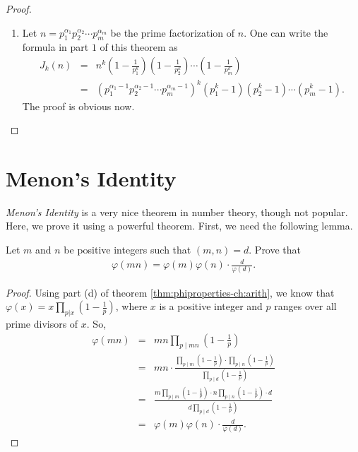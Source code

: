 \documentclass[12pt]{subfile}
\begin{document}
\begin{proof}
\begin{enumerate}
				\item Let $n = p_1^{\alpha_1}p_2^{\alpha_2} \cdots p_m^{\alpha_m}$ be the prime factorization of $n$. One can write the formula in part $1$ of this theorem as
					\begin{eqnarray*}
						J_k(n) &=& n^k \left(1 - \frac{1}{p_1^k}\right) \left(1 - \frac{1}{p_2^k}\right)\cdots \left(1 - \frac{1}{p_m^k}\right)\\
							   &=& \left(p_1^{\alpha_1- 1}p_2^{\alpha_2 -1 } \cdots p_m^{\alpha_m -1 }\right)^k \left(p_1^k -1 \right) \left(p_2^k -1 \right) \cdots \left(p_m^k -1 \right).
					\end{eqnarray*}
				The proof is obvious now.
			\end{enumerate}
		\end{proof}


\section{Menon's Identity}
	\textit{Menon's Identity} is a very nice theorem in number theory, though not popular. Here, we prove it using a powerful theorem. First, we need the following lemma.
		\begin{lemma}\label{lem:phigcd}
			Let $m$ and $n$ be positive integers such that $(m,n)=d$. Prove that
				\begin{align*}
					\varphi (mn) = \varphi (m) \varphi (n) \cdot \frac{d}{\varphi (d)}.
				\end{align*}
		\end{lemma}
	
		\begin{proof}
			Using part (d) of theorem \eqref{thm:phiproperties-ch:arith}, we know that $\varphi(x) = x \prod\limits_{p|x} \left(1 - \frac{1}{p}\right)$, where $x$ is a positive integer and $p$ ranges over all prime divisors of $x$. So,
				\begin{eqnarray*}
					\varphi(mn) &=& mn \prod\limits_{p \mid mn} \left( 1 - \frac 1p \right)\\
								&=& mn \cdot\frac{\prod\limits_{p \mid m} \left( 1 - \frac 1p \right) \cdot \prod\limits_{p \mid n} \left( 1 - \frac 1p \right)}{\prod\limits_{p \mid d} \left( 1 - \frac 1p \right)}\\
								&=& \frac{m\prod\limits_{p \mid m} \left( 1 - \frac 1p \right) \cdot n \prod\limits_{p \mid n} \left( 1 - \frac 1p \right) \cdot d}{d\prod\limits_{p \mid d} \left( 1 - \frac 1p \right)}\\
								&=& \varphi(m)\varphi(n) \cdot \frac{d}{\varphi(d)}.
				\end{eqnarray*}
		\end{proof}
	
\end{document}
